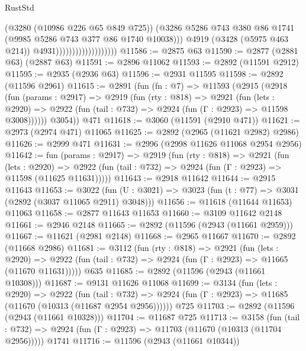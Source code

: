 \begin{lexlean}{RustStd}
\begin{coremodule}
                                            (@3280 (@10986 @226 @65 @849 @725))
                                            (@3286
                                              @5286
                                              @743
                                              @380
                                              @86
                                              @1741
                                              (@9985 @5286 @743 @377 @86 @1740 @10038)))
                                          @4919
                                          (@3428 (@5975 @463 @214))
                                          @4931)))))))))))))))))))
@11586 := @2875 @63
@11590 := @2877 (@2881 @63) (@2887 @63)
@11591 := @2896 @11062
@11593 := @2892 (@11591 @2912)
@11595 := @2935 (@2936 @63)
@11596 := @2931 @11595
@11598 := @2892 (@11596 @2961)
@11615 := @2891
    (fun (fn : @7) =>
    @11593
      (@2915
        (@2918
          (fun (params : @2917) =>
          @2919
            (fun (rty : @818) =>
            @2921
              (fun (lets : @2920) =>
              @2922 (fun (tail : @732) => @2924 (fun (Γ : @2923) => @11598 @3008))))))
        @3054))
    @471
@11618 := @3060 (@11591 (@2910 @471))
@11621 := @2973 (@2974 @471) @11065
@11625 := @2892 (@2965 (@11621 @2982) @2986)
@11626 := @2999 @471
@11631 := @2996 (@2998 @11626 @11068 @2954 @2956)
@11642 := fun (params : @2917) =>
  @2919
    (fun (rty : @818) =>
    @2921
      (fun (lets : @2920) =>
      @2922 (fun (tail : @732) => @2924 (fun (Γ : @2923) => @11598 (@11625 @11631)))))
@11643 := @2918 @11642
@11644 := @2915 @11643
@11653 := @3022
    (fun (U : @3021) => @3023 (fun (t : @77) => @3031 (@2892 (@3037 @11065 @2911) @3048)))
@11656 := @11618 (@11644 @11653) @11063
@11658 := @2877 @11643 @11653
@11660 := @3109 @11642 @2148
@11661 := @2946 @2148
@11665 := @2892 (@11596 (@2943 (@11661 @2959)))
@11667 := @11621 (@2981 @2148)
@11668 := @2965 @11667
@11670 := @2892 (@11668 @2986)
@11681 := @3112
    (fun (rty : @818) =>
    @2921
      (fun (lets : @2920) =>
      @2922 (fun (tail : @732) => @2924 (fun (Γ : @2923) => @11665 (@11670 @11631)))))
    @635
@11685 := @2892 (@11596 (@2943 (@11661 @10308)))
@11687 := @9131 @11626 @11068
@11699 := @3134
    (fun (lets : @2920) =>
    @2922
      (fun (tail : @732) =>
      @2924 (fun (Γ : @2923) => @11685 (@11670 (@10313 (@11687 @2954 @2956))))))
    @725
@11703 := @2892 (@11596 (@2943 (@11661 @10328)))
@11704 := @11687 @725
@11713 := @3158
    (fun (tail : @732) => @2924 (fun (Γ : @2923) => @11703 (@11670 (@10313 (@11704 @2956)))))
    @1741
@11716 := @11596 (@2943 (@11661 @10344))

\end{coremodule}
\end{lexlean}
